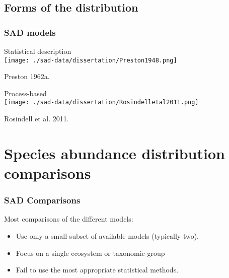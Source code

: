 \documentclass[14pt]{beamer}
\begin{document}
\subsection{Forms of the distribution}
\begin{frame}[t]
\frametitle{SAD models}
Statistical description\\  
\texttt{[image: ./sad-data/dissertation/Preston1948.png]}\\

\begin{tiny}
Preston 1962a.\\
\end{tiny}

Process-based\\
\texttt{[image: ./sad-data/dissertation/Rosindelletal2011.png]}\\
\begin{tiny}
Rosindell et al. 2011.
\end{tiny}
\end{frame}
 

\section{Species abundance distribution comparisons}
\begin{frame}
\frametitle{SAD Comparisons}
\begin{large}
Most comparisons of the different models:
\end{large}
\begin{itemize}
\item Use only a small subset of available models (typically two).
\item Focus on a single ecosystem or taxonomic group
\item Fail to use the most appropriate statistical methods. 
\end{itemize}
\end{frame}
\end{document}

